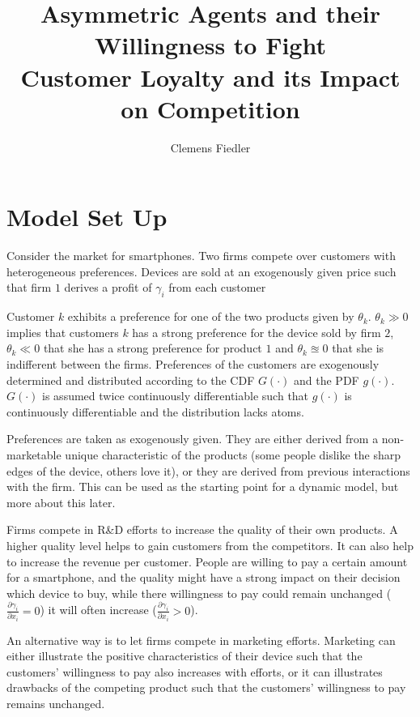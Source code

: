 \documentclass[a4paper, 11pt]{article}
\author{Clemens Fiedler}
\title{Asymmetric Agents and their Willingness to Fight\\
	Customer Loyalty and its Impact on Competition}
\begin{document}
	
\maketitle

\section{Model Set Up}
Consider the market for smartphones. Two firms compete over customers with heterogeneous preferences. Devices are sold at an exogenously given price such that firm $1$ derives a profit of $\gamma_i$ from each customer
 
Customer $k$ exhibits a preference for one of the two products given by $\theta_k$. $\theta_k\gg0$ implies that customers $k$ has a strong preference for the device sold by firm $2$, $\theta_k\ll0$ that she has a strong preference for product $1$ and $\theta_k\approxeq 0$ that she is indifferent between the firms. Preferences of the customers are exogenously determined and distributed according to the CDF $G(\cdot)$ and the PDF $g(\cdot)$. $G(\cdot)$ is assumed twice continuously differentiable such that $g(\cdot)$ is continuously differentiable and the distribution lacks atoms. 

Preferences are taken as exogenously given. They are either derived from a non-marketable unique characteristic of the products (some people dislike the sharp edges of the device, others love it), or they are derived from previous interactions with the firm. This can be used as the starting point for a dynamic model, but more about this later.

Firms compete in R\&D efforts to increase the quality of their own products. A higher quality level helps to gain customers from the competitors. It can also help to increase the revenue per customer. People are willing to pay a certain amount for a smartphone, and the quality might have a strong impact on their decision which device to buy, while there willingness to pay could remain unchanged ($\frac{\partial \gamma_i}{\partial x_i}=0$) it will often increase ($\frac{\partial \gamma_i}{\partial x_i}>0$).

An alternative way is to let firms compete in marketing efforts. Marketing can either illustrate the positive characteristics of their device such that the customers' willingness to pay also increases with efforts, or it can illustrates drawbacks of the competing product such that the customers' willingness to pay remains unchanged.
\end{document}
